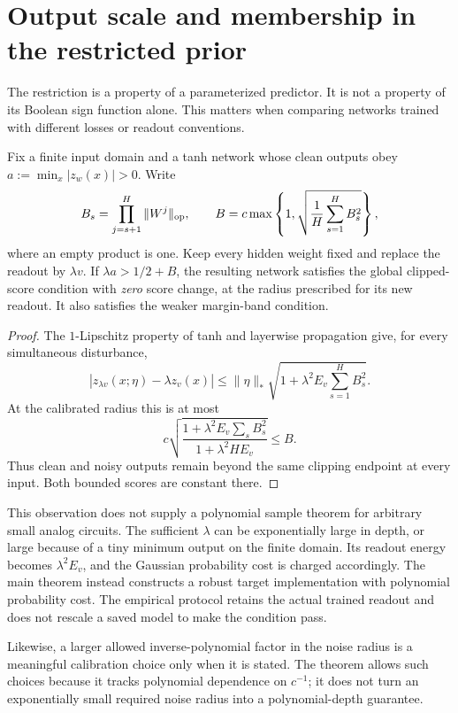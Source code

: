 \section{Output scale and membership in the restricted prior}
\label{sec:output-rescaling}

The restriction is a property of a parameterized predictor. It is not a
property of its Boolean sign function alone. This matters when comparing
networks trained with different losses or readout conventions.

\begin{proposition}
\label{prop:output-rescaling}
Fix a finite input domain and a tanh network whose clean outputs obey
$a:=\min_x|z_w(x)|>0$. Write
\[
 B_s=\prod_{j=s+1}^{H}\|W^j\|_{\rm op},\qquad
 B=c\max\left\{1,
                 \sqrt{\frac1H\sum_{s=1}^{H}B_s^2}\right\},
\]
where an empty product is one. Keep every hidden weight fixed and replace
the readout by $\lambda v$. If $\lambda a>1/2+B$, the resulting network
satisfies the global clipped-score condition with \emph{zero} score
change, at the radius prescribed for its new readout. It also satisfies
the weaker margin-band condition.
\end{proposition}

\begin{proof}
The $1$-Lipschitz property of tanh and layerwise propagation give, for
every simultaneous disturbance,
\[
 |z_{\lambda v}(x;\eta)-\lambda z_v(x)|
 \le \|\eta\|_*
       \sqrt{1+\lambda^2 E_v\sum_{s=1}^{H}B_s^2}.
\]
At the calibrated radius this is at most
\[
 c\sqrt{\frac{1+\lambda^2 E_v\sum_s B_s^2}
                 {1+\lambda^2 H E_v}}
 \le B.
\]
Thus clean and noisy outputs remain beyond the same clipping endpoint
at every input. Both bounded scores are constant there.
\end{proof}

This observation does not supply a polynomial sample theorem for arbitrary
small analog circuits. The sufficient $\lambda$ can be exponentially large
in depth, or large because of a tiny minimum output on the finite domain.
Its readout energy becomes $\lambda^2E_v$, and the Gaussian probability
cost is charged accordingly. The main theorem instead constructs a robust
target implementation with polynomial probability cost. The empirical
protocol retains the actual trained readout and does not rescale a saved
model to make the condition pass.

Likewise, a larger allowed inverse-polynomial factor in the noise radius
is a meaningful calibration choice only when it is stated. The theorem
allows such choices because it tracks polynomial dependence on $c^{-1}$;
it does not turn an exponentially small required noise radius into a
polynomial-depth guarantee.
